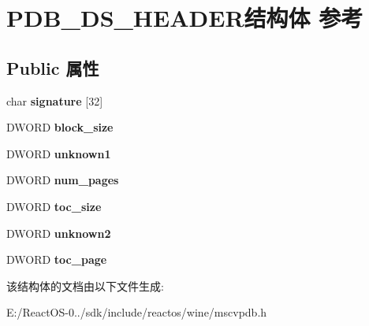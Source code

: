 \hypertarget{struct_p_d_b___d_s___h_e_a_d_e_r}{}\section{P\+D\+B\+\_\+\+D\+S\+\_\+\+H\+E\+A\+D\+E\+R结构体 参考}
\label{struct_p_d_b___d_s___h_e_a_d_e_r}
\subsection*{Public 属性}
\begin{DoxyCompactItemize}
\item 
\mbox{\label{struct_p_d_b___d_s___h_e_a_d_e_r_acd02e09ee8a7b0ca6fa471f127911b9c}} 
char {\bfseries signature} \mbox{[}32\mbox{]}
\item 
\mbox{\label{struct_p_d_b___d_s___h_e_a_d_e_r_a1bb17c05953e74e4b62cc19d90cd32cc}} 
D\+W\+O\+RD {\bfseries block\+\_\+size}
\item 
\mbox{\label{struct_p_d_b___d_s___h_e_a_d_e_r_ae35fb940be28bfc2271626fdcb1c40be}} 
D\+W\+O\+RD {\bfseries unknown1}
\item 
\mbox{\label{struct_p_d_b___d_s___h_e_a_d_e_r_aad40915b42eb682de793df99cb0f8746}} 
D\+W\+O\+RD {\bfseries num\+\_\+pages}
\item 
\mbox{\label{struct_p_d_b___d_s___h_e_a_d_e_r_a8eddf1b8192fa5d6aa87cdc5c4a15b30}} 
D\+W\+O\+RD {\bfseries toc\+\_\+size}
\item 
\mbox{\label{struct_p_d_b___d_s___h_e_a_d_e_r_a0d806283adfdd201b475ca37f3880a87}} 
D\+W\+O\+RD {\bfseries unknown2}
\item 
\mbox{\label{struct_p_d_b___d_s___h_e_a_d_e_r_a6316f64473b8f234ff6f48f1e27384c5}} 
D\+W\+O\+RD {\bfseries toc\+\_\+page}
\end{DoxyCompactItemize}


该结构体的文档由以下文件生成\+:\begin{DoxyCompactItemize}
\item 
E\+:/\+React\+O\+S-\/0../sdk/include/reactos/wine/mscvpdb.\+h\end{DoxyCompactItemize}
